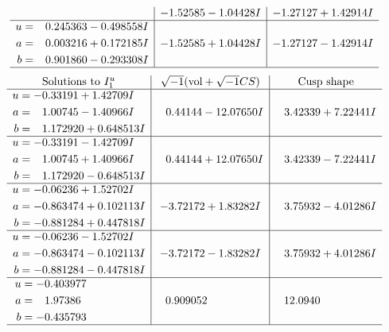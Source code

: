 \documentclass[1p]{elsarticle_modified}
\theoremstyle{definition}
\newcommand{\I}{\sqrt{-1}}
\begin{document}
$$\begin{array}{c|c|c}
 & -1.52585 - 1.04428 I & -1.27127 + 1.42914 I \\ \hline\begin{aligned}
u &= \phantom{-}0.245363 - 0.498558 I \\
a &= \phantom{-}0.003216 + 0.172185 I \\
b &= \phantom{-}0.901860 - 0.293308 I\end{aligned}
 & -1.52585 + 1.04428 I & -1.27127 - 1.42914 I\\
 \hline 
 \end{array}$$\newpage$$\begin{array}{c|c|c}  
\text{Solutions to }I^u_{1}& \I (\text{vol} + \sqrt{-1}CS) & \text{Cusp shape}\\
 \hline 
\begin{aligned}
u &= -0.33191 + 1.42709 I \\
a &= \phantom{-}1.00745 - 1.40966 I \\
b &= \phantom{-}1.172920 + 0.648513 I\end{aligned}
 & \phantom{-}0.44144 - 12.07650 I & \phantom{-}3.42339 + 7.22441 I \\ \hline\begin{aligned}
u &= -0.33191 - 1.42709 I \\
a &= \phantom{-}1.00745 + 1.40966 I \\
b &= \phantom{-}1.172920 - 0.648513 I\end{aligned}
 & \phantom{-}0.44144 + 12.07650 I & \phantom{-}3.42339 - 7.22441 I \\ \hline\begin{aligned}
u &= -0.06236 + 1.52702 I \\
a &= -0.863474 + 0.102113 I \\
b &= -0.881284 + 0.447818 I\end{aligned}
 & -3.72172 + 1.83282 I & \phantom{-}3.75932 - 4.01286 I \\ \hline\begin{aligned}
u &= -0.06236 - 1.52702 I \\
a &= -0.863474 - 0.102113 I \\
b &= -0.881284 - 0.447818 I\end{aligned}
 & -3.72172 - 1.83282 I & \phantom{-}3.75932 + 4.01286 I \\ \hline\begin{aligned}
u &= -0.403977\phantom{ +0.000000I} \\
a &= \phantom{-}1.97386\phantom{ +0.000000I} \\
b &= -0.435793\phantom{ +0.000000I}\end{aligned}
 & \phantom{-}0.909052\phantom{ +0.000000I} & \phantom{-}12.0940\phantom{ +0.000000I}\\
 \hline 
 \end{array}$$\newpage\newpage\renewcommand{\arraystretch}{1}
\end{document}
